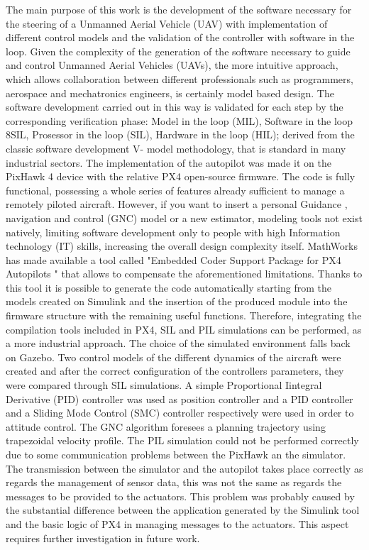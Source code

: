 \begin{commento}
The main purpose of this work is the development of the software necessary for the steering of a Unmanned Aerial Vehicle (UAV) with implementation of different control models and  the validation of the controller with software in the loop.
Given the complexity of the generation of the software necessary to guide and control Unmanned Aerial Vehicles (UAVs), the more intuitive approach, which allows collaboration between different professionals such as programmers, aerospace and mechatronics engineers, is certainly model based design.
The software development carried out in this way is validated for each step by the corresponding verification phase: Model in the loop (MIL), Software in the loop 8SIL, Prosessor in the loop (SIL), Hardware in the loop (HIL); derived from the classic software development V- model methodology, that is standard in many industrial sectors.
The implementation of the autopilot was made it on the PixHawk 4 device with the relative PX4 open-source firmware. The code is fully functional, possessing a whole series of features already sufficient to manage a remotely piloted aircraft. However, if you want to insert a personal Guidance , navigation and control (GNC) model or a new estimator, modeling tools not exist natively, limiting software development only to people with high Information technology (IT) skills, increasing the  overall design complexity itself.
MathWorks has made available a tool called "Embedded Coder Support Package
for PX4 Autopilots " that allows to compensate the aforementioned limitations. Thanks to this tool it is possible to generate the code automatically starting from the models created on Simulink and the insertion of the produced module into the firmware structure with the remaining useful functions. Therefore, integrating the compilation tools included in PX4, SIL and PIL simulations can be performed, as a more industrial approach.
The choice of the simulated environment falls back on Gazebo.
Two control models of the different dynamics of the aircraft were created and after the correct configuration of the controllers parameters, they were compared through SIL simulations. A simple Proportional Iintegral Derivative (PID) controller was used as position controller and a PID controller and a Sliding Mode Control (SMC) controller respectively were used in order to attitude control. The GNC algorithm foresees a planning trajectory using trapezoidal velocity profile.
The PIL simulation could not be performed correctly due to some communication problems between the PixHawk an the simulator. The transmission between the simulator and the autopilot takes place correctly as regards the management of sensor data, this was not the same as regards the messages to be provided to the actuators. This problem was probably caused by the substantial difference between the application generated by the Simulink tool and the basic logic of PX4 in managing messages to the actuators. This aspect requires further investigation in future work.



\end{commento}
